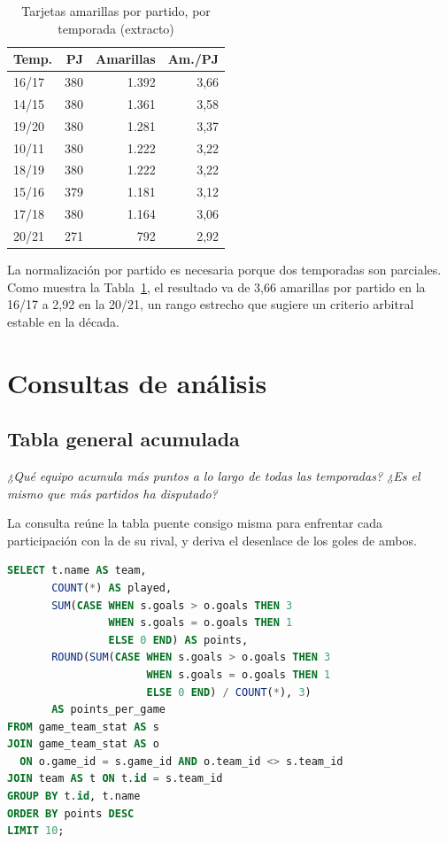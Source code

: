 \documentclass[conference]{IEEEtran}
\begin{document}
\begin{table}[htbp]
\caption{Tarjetas amarillas por partido, por temporada (extracto)}
\label{tab:amarillas}
\centering
\begin{tabular}{lrrr}
\toprule
\textbf{Temp.} & \textbf{PJ} & \textbf{Amarillas} & \textbf{Am./PJ} \\
\midrule
16/17 & 380 & 1.392 & 3,66 \\
14/15 & 380 & 1.361 & 3,58 \\
19/20 & 380 & 1.281 & 3,37 \\
10/11 & 380 & 1.222 & 3,22 \\
18/19 & 380 & 1.222 & 3,22 \\
15/16 & 379 & 1.181 & 3,12 \\
17/18 & 380 & 1.164 & 3,06 \\
20/21 & 271 & 792   & 2,92 \\
\bottomrule
\end{tabular}
\end{table}

La normalización por partido es necesaria porque dos temporadas son parciales.
Como muestra la Tabla~\ref{tab:amarillas}, el resultado va de 3,66 amarillas
por partido en la 16/17 a 2,92 en la 20/21, un rango estrecho que sugiere un
criterio arbitral estable en la década.

\section{Consultas de análisis}
\label{sec:analisis}

\subsection{Tabla general acumulada}

\emph{¿Qué equipo acumula más puntos a lo largo de todas las temporadas? ¿Es el
mismo que más partidos ha disputado?}

La consulta reúne la tabla puente consigo misma para enfrentar cada
participación con la de su rival, y deriva el desenlace de los goles de ambos.

\begin{lstlisting}[language=SQL]
SELECT t.name AS team,
       COUNT(*) AS played,
       SUM(CASE WHEN s.goals > o.goals THEN 3
                WHEN s.goals = o.goals THEN 1
                ELSE 0 END) AS points,
       ROUND(SUM(CASE WHEN s.goals > o.goals THEN 3
                      WHEN s.goals = o.goals THEN 1
                      ELSE 0 END) / COUNT(*), 3)
       AS points_per_game
FROM game_team_stat AS s
JOIN game_team_stat AS o
  ON o.game_id = s.game_id AND o.team_id <> s.team_id
JOIN team AS t ON t.id = s.team_id
GROUP BY t.id, t.name
ORDER BY points DESC
LIMIT 10;
\end{lstlisting}
\end{document}
